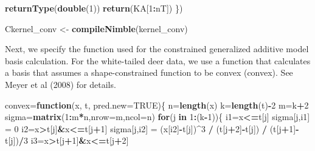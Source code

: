 \documentclass[11pt,]{article}
\newenvironment{Shaded}{\begin{snugshade}}{\end{snugshade}}
\newcommand{\KeywordTok}[1]{\textcolor[rgb]{0.13,0.29,0.53}{\textbf{#1}}}
\newcommand{\DataTypeTok}[1]{\textcolor[rgb]{0.13,0.29,0.53}{#1}}
\newcommand{\DecValTok}[1]{\textcolor[rgb]{0.00,0.00,0.81}{#1}}
\newcommand{\StringTok}[1]{\textcolor[rgb]{0.31,0.60,0.02}{#1}}
\newcommand{\OtherTok}[1]{\textcolor[rgb]{0.56,0.35,0.01}{#1}}
\newcommand{\ControlFlowTok}[1]{\textcolor[rgb]{0.13,0.29,0.53}{\textbf{#1}}}
\newcommand{\OperatorTok}[1]{\textcolor[rgb]{0.81,0.36,0.00}{\textbf{#1}}}
\newcommand{\NormalTok}[1]{#1}
\begin{document}
\begin{Shaded}
\begin{Highlighting}[]
    \KeywordTok{returnType}\NormalTok{(}\KeywordTok{double}\NormalTok{(}\DecValTok{1}\NormalTok{))}
    \KeywordTok{return}\NormalTok{(KA[}\DecValTok{1}\OperatorTok{:}\NormalTok{nT])}
\NormalTok{  \})}

\NormalTok{Ckernel_conv <-}\StringTok{ }\KeywordTok{compileNimble}\NormalTok{(kernel_conv)}
\end{Highlighting}
\end{Shaded}

Next, we specify the function used for the constrained generalized
additive model basis calculation. For the white-tailed deer data, we use
a function that calculates a basis that assumes a shape-constrained
function to be convex (convex). See Meyer et al (2008) for details.

\begin{Shaded}
\begin{Highlighting}[]
\NormalTok{convex=}\ControlFlowTok{function}\NormalTok{(x, t, }\DataTypeTok{pred.new=}\OtherTok{TRUE}\NormalTok{)\{}
\NormalTok{  n=}\KeywordTok{length}\NormalTok{(x)}
\NormalTok{  k=}\KeywordTok{length}\NormalTok{(t)}\OperatorTok{-}\DecValTok{2}
\NormalTok{  m=k}\OperatorTok{+}\DecValTok{2}
\NormalTok{  sigma=}\KeywordTok{matrix}\NormalTok{(}\DecValTok{1}\OperatorTok{:}\NormalTok{m}\OperatorTok{*}\NormalTok{n,}\DataTypeTok{nrow=}\NormalTok{m,}\DataTypeTok{ncol=}\NormalTok{n)}
  \ControlFlowTok{for}\NormalTok{(j }\ControlFlowTok{in} \DecValTok{1}\OperatorTok{:}\NormalTok{(k}\OperatorTok{-}\DecValTok{1}\NormalTok{))\{}
\NormalTok{    i1=x}\OperatorTok{<=}\NormalTok{t[j]}
\NormalTok{    sigma[j,i1] =}\StringTok{ }\DecValTok{0}
\NormalTok{    i2=x}\OperatorTok{>}\NormalTok{t[j]}\OperatorTok{&}\NormalTok{x}\OperatorTok{<=}\NormalTok{t[j}\OperatorTok{+}\DecValTok{1}\NormalTok{]}
\NormalTok{    sigma[j,i2] =}\StringTok{ }\NormalTok{(x[i2]}\OperatorTok{-}\NormalTok{t[j])}\OperatorTok{^}\DecValTok{3} \OperatorTok{/}\StringTok{ }\NormalTok{(t[j}\OperatorTok{+}\DecValTok{2}\NormalTok{]}\OperatorTok{-}\NormalTok{t[j]) }\OperatorTok{/}\StringTok{ }\NormalTok{(t[j}\OperatorTok{+}\DecValTok{1}\NormalTok{]}\OperatorTok{-}\NormalTok{t[j])}\OperatorTok{/}\DecValTok{3}
\NormalTok{    i3=x}\OperatorTok{>}\NormalTok{t[j}\OperatorTok{+}\DecValTok{1}\NormalTok{]}\OperatorTok{&}\NormalTok{x}\OperatorTok{<=}\NormalTok{t[j}\OperatorTok{+}\DecValTok{2}\NormalTok{]}

\end{Highlighting}
\end{Shaded}
\end{document}
